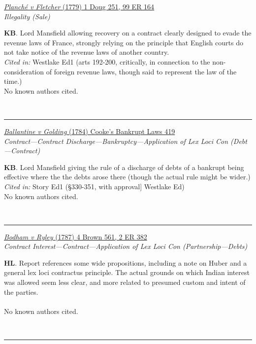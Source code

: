 \documentclass[twoside]{article}
\begin{document}
        \begin{small}
        \begin{center}
        \href{https://heinonline.org/HOL/P?h=hein.engrep/engrf0099&i=168}{\textit{Planché v Fletcher} (1779) 1 Doug 251, 99 ER 164} \label{77} \\ 
\textit{Illegality (Sale)}\\
        \end{center}
        \textbf{KB}. Lord Mansfield allowing recovery on a contract clearly designed to evade the revenue laws of France, strongly relying on the principle that English courts do not take notice of the revenue laws of another country.\\\textit{Cited in: }Westlake Ed1 (arts 192-200, critically, in connection to the non-consideration of foreign revenue laws, though said to represent the law of the time.)\\No known authors cited.
        \end{small}\\
        \rule{\textwidth}{0.5pt}
        

        \begin{small}
        \begin{center}
        \href{https://link.gale.com/apps/doc/CW0125544801/ECCO?u=oxford&sid=gale_marc&xid=19b67222&pg=534}{\textit{Ballantine v Golding} (1784) Cooke’s Bankrupt Laws 419} \label{39} \\ 
\textit{Contract---Contract Discharge---Bankruptcy---Application of Lex Loci Con (Debt---Contract)}\\
        \end{center}
        \textbf{KB}. Lord Mansfield giving the rule of a discharge of debts of a bankrupt being effective where the the debts arose there (though the actual rule might be wider.)\\\textit{Cited in: }Story Ed1 (§330-351, with approval] Westlake Ed)\\No known authors cited.
        \end{small}\\
        \rule{\textwidth}{0.5pt}
        

        \begin{small}
        \begin{center}
        \href{https://heinonline.org/HOL/P?h=hein.engrep/engra0002&i=390}{\textit{Bodham v Ryley} (1787) 4 Brown 561, 2 ER 382} \label{21} \\ 
\textit{Contract Interest---Contract---Application of Lex Loci Con (Partnership---Debts)}\\
        \end{center}
        \textbf{HL}. Report references some wide propositions, including a note on Huber and a general lex loci contractus principle. The actual grounds on which Indian interest was allowed seem less clear, and more related to presumed custom and intent of the parties.\\\\No known authors cited.
        \end{small}\\
        \rule{\textwidth}{0.5pt}
        
\end{document}
